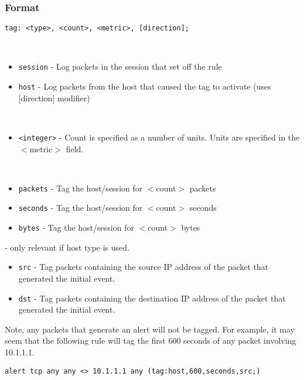 \documentclass[english]{report}
\begin{document}
\subsubsection{Format}

\begin{verbatim}
tag: <type>, <count>, <metric>, [direction];
\end{verbatim}

\begin{description}{}
  \item [\texttt{type}]~
     \begin{itemize}{}
     \item \texttt{session} - Log packets in the session that set off the rule 
     \item \texttt{host} - Log packets from the host that caused the tag to activate (uses {[}direction{]} modifier)
     \end{itemize}
  \item [\texttt{count}]~
     \begin{itemize}{}
     \item \texttt{<integer>} - Count is specified as a number of units. Units are specified in the $<$metric$>$ field.
     \end{itemize}{}
  \item [\texttt{metric}]~
  \begin{itemize}{}
      \item \texttt{packets} - Tag the host/session for $<$count$>$ packets 
      \item \texttt{seconds} - Tag the host/session for $<$count$>$ seconds
      \item \texttt{bytes}   - Tag the host/session for $<$count$>$ bytes
   \end{itemize}
  \item [\texttt{direction}] - only relevant if host type is used.
  \begin{itemize}{}
       \item \texttt{src} - Tag packets containing the source IP address of the packet that generated the initial event.
       \item \texttt{dst} - Tag packets containing the destination IP address of the packet that generated the initial event.
  \end{itemize}
\end{description}

Note, any packets that generate an alert will not be tagged.  For example, it may seem that the following rule will tag the first 600 seconds of any packet involving 10.1.1.1.
\begin{verbatim}
alert tcp any any <> 10.1.1.1 any (tag:host,600,seconds,src;)
\end{verbatim}
\end{document}

